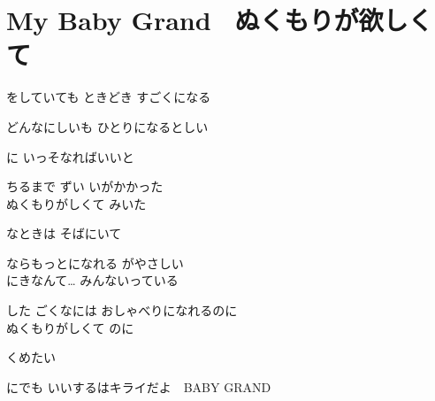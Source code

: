 \section{ My Baby Grand ~ぬくもりが欲しくて~}

\large{

をしていても ときどき すごくになる

どんなにしいも ひとりになるとしい

に いっそなればいいと

ちるまで ずい いがかかった
\\

ぬくもりがしくて みいた

なときは そばにいて

ならもっとになれる がやさしい
\\

にきなんて… みんないっている

した ごくなには おしゃべりになれるのに
\\

ぬくもりがしくて のに

くめたい

にでも いいするはキライだよ　BABY GRAND
\\


}
